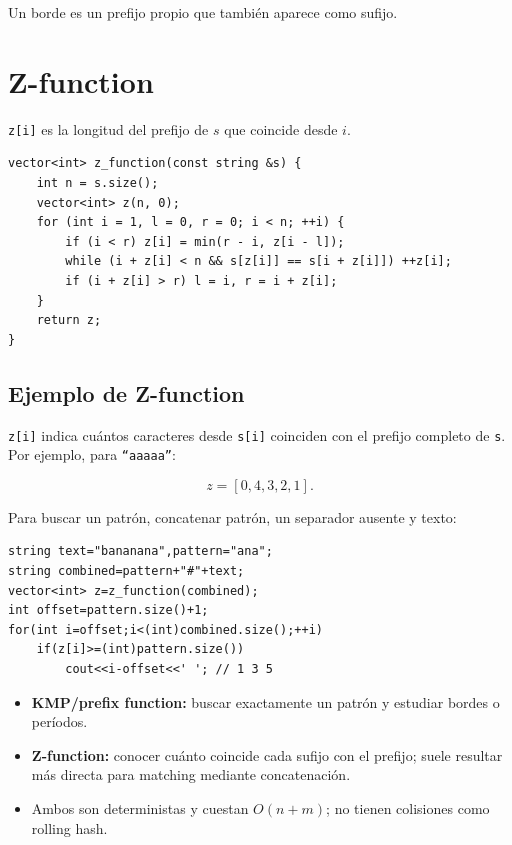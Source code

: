 Un borde es un prefijo propio que también aparece como sufijo.
\section{Z-function}

\texttt{z[i]} es la longitud del prefijo de $s$ que coincide desde $i$.

\begin{lstlisting}[style=cpp]
vector<int> z_function(const string &s) {
    int n = s.size();
    vector<int> z(n, 0);
    for (int i = 1, l = 0, r = 0; i < n; ++i) {
        if (i < r) z[i] = min(r - i, z[i - l]);
        while (i + z[i] < n && s[z[i]] == s[i + z[i]]) ++z[i];
        if (i + z[i] > r) l = i, r = i + z[i];
    }
    return z;
}
\end{lstlisting}


\subsection{Ejemplo de Z-function}

\texttt{z[i]} indica cuántos caracteres desde \texttt{s[i]} coinciden con el
prefijo completo de \texttt{s}. Por ejemplo, para \texttt{``aaaaa''}:

\[
z=[0,4,3,2,1].
\]

Para buscar un patrón, concatenar patrón, un separador ausente y texto:

\begin{lstlisting}[style=cpp]
string text="bananana",pattern="ana";
string combined=pattern+"#"+text;
vector<int> z=z_function(combined);
int offset=pattern.size()+1;
for(int i=offset;i<(int)combined.size();++i)
    if(z[i]>=(int)pattern.size())
        cout<<i-offset<<' '; // 1 3 5
\end{lstlisting}


\begin{itemize}
    \item \textbf{KMP/prefix function:} buscar exactamente un patrón y estudiar
    bordes o períodos.
    \item \textbf{Z-function:} conocer cuánto coincide cada sufijo con el prefijo;
    suele resultar más directa para matching mediante concatenación.
    \item Ambos son deterministas y cuestan $O(n+m)$; no tienen colisiones como
    rolling hash.
\end{itemize}